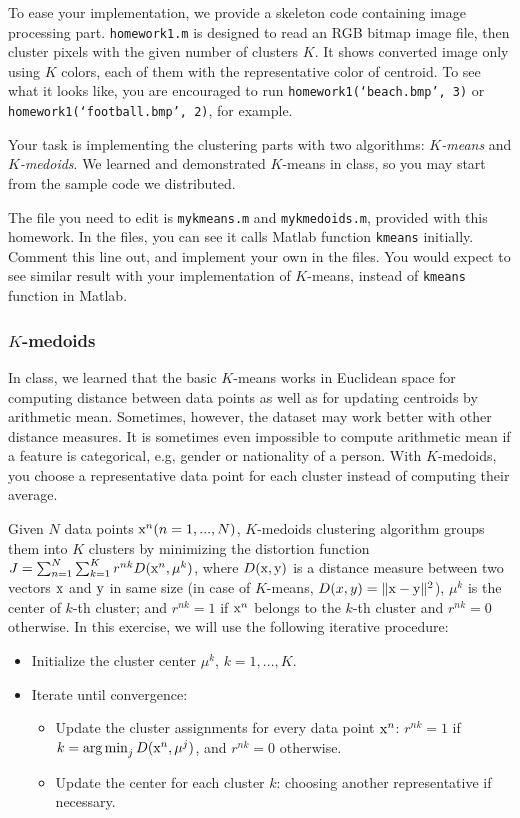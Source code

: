 \documentclass[twoside,10pt]{article}
\begin{document}
To ease your implementation, we provide a skeleton code containing image processing part. \texttt{homework1.m} is designed to read an RGB bitmap image file, then cluster pixels with the given number of clusters $K$. It shows converted image only using $K$ colors, each of them with the representative color of centroid. To see what it looks like, you are encouraged to run \texttt{homework1(`beach.bmp', 3)} or \texttt{homework1(`football.bmp', 2)}, for example.

Your task is implementing the clustering parts with two algorithms: \emph{$K$-means} and \emph{$K$-medoids}. We learned and demonstrated $K$-means in class, so you may start from the sample code we distributed.

The file you need to edit is \texttt{mykmeans.m} and \texttt{mykmedoids.m}, provided with this homework. In the files, you can see it calls Matlab function \texttt{kmeans} initially. Comment this line out, and implement your own in the files. You would expect to see similar result with your implementation of $K$-means, instead of \texttt{kmeans} function in Matlab.

\subsubsection*{$K$-medoids}

In class, we learned that the basic $K$-means works in Euclidean space for computing distance between data points as well as for updating centroids by arithmetic mean. Sometimes, however, the dataset may work better with other distance measures. It is sometimes even impossible to compute arithmetic mean if a feature is categorical, e.g, gender or nationality of a person. With $K$-medoids, you choose a representative data point for each cluster instead of computing their average.

Given $N$ data points $\text x^n (n = 1, ..., N)$, $K$-medoids clustering algorithm groups them into $K$ clusters by minimizing the distortion function $J = \sum_{n=1}^N \sum_{k=1}^K r^{nk} D(\text x^n, \mu^k)$,
where $D(\text x, \text y)$ is a distance measure between two vectors $\text x$ and $\text y$ in same size (in case of $K$-means, $D(x, y) = \| \text x - \text y \|^2$), $\mu^k$ is the center of $k$-th cluster; and $r^{nk} = 1$ if $\text x^n$ belongs to the $k$-th cluster and $r^{nk} = 0$ otherwise. In this exercise, we will use the following iterative procedure:

\begin{itemize}
  \item Initialize the cluster center $\mu^k$, $k = 1, ..., K$.
  \item Iterate until convergence:
  \begin{itemize}
    \item Update the cluster assignments for every data point $\text x^n$: $r^{nk} = 1$ if $k = \argmin_j D(\text x^n, \mu^j)$, and $r^{nk} = 0$ otherwise.
    \item Update the center for each cluster $k$: choosing another representative if necessary.
  \end{itemize}
\end{itemize}
\end{document}
